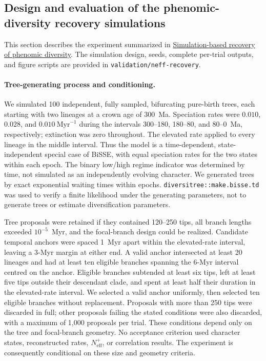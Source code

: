 \subsection*{Design and evaluation of the phenomic-diversity recovery simulations}
\label{sec:neff-supplement}

This section describes the experiment summarized in
\hyperref[sec:neff-main]{Simulation-based recovery of phenomic diversity}.
The simulation design, seeds, complete per-trial outputs, and figure scripts
are provided in \texttt{validation/}\allowbreak\texttt{neff-recovery}.

\paragraph{Tree-generating process and conditioning.}
We simulated 100 independent, fully sampled, bifurcating pure-birth trees,
each starting with two lineages at a crown age of 300~Ma. Speciation rates
were $0.010$, $0.028$, and $0.010~\mathrm{Myr}^{-1}$ during the intervals
300--180, 180--80, and 80--0~Ma, respectively; extinction was zero throughout.
The elevated rate applied to every lineage in the middle interval.
Thus the model is a time-dependent, state-independent special case of BiSSE,
with equal speciation rates for the two states within each epoch. The binary
low/high regime indicator was determined by time, not simulated as an
independently evolving character. We generated trees by exact exponential
waiting times within epochs. \texttt{diversitree::make.bisse.td} was used to
verify a finite likelihood under the generating parameters, not to generate
trees or estimate diversification parameters.

Tree proposals were retained if they contained 120--250 tips, all branch
lengths exceeded $10^{-5}$~Myr, and the focal-branch design could be realized.
Candidate temporal anchors were spaced 1~Myr apart within the elevated-rate
interval, leaving a 3-Myr margin at either end. A valid anchor intersected
at least 20 lineages and had at least ten eligible branches spanning the
6-Myr interval centred on the anchor. Eligible branches subtended at least
six tips, left at least five tips outside their descendant clade, and spent
at least half their duration in the elevated-rate interval. We selected a
valid anchor uniformly, then selected ten eligible branches without
replacement. Proposals with more than 250 tips were discarded in full;
other proposals failing the stated conditions were also discarded, with a
maximum of 1,000 proposals per trial. These conditions depend only on the
tree and focal-branch geometry. No acceptance criterion used character
states, reconstructed rates, $N_{\mathrm{eff}}^{+}$, or correlation results.
The experiment is consequently conditional on these size and geometry criteria.

